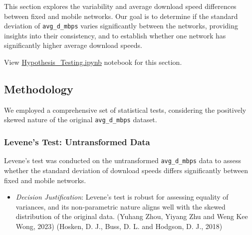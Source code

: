 \documentclass[
  letterpaper,
  DIV=11,
  numbers=noendperiod,
  oneside]{scrartcl}
\providecommand{\tightlist}{%
  \setlength{\itemsep}{0pt}\setlength{\parskip}{0pt}}\usepackage{longtable,booktabs,array}
\begin{document}
This section explores the variability and average download speed
differences between fixed and mobile networks. Our goal is to determine
if the standard deviation of \texttt{avg\_d\_mbps} varies significantly
between the networks, providing insights into their consistency, and to
establish whether one network has significantly higher average download
speeds.

\begin{tcolorbox}[enhanced jigsaw, title=\textcolor{quarto-callout-tip-color}{\faLightbulb}\hspace{0.5em}{Hypothesis Definition and Testing Section Source Code}, toptitle=1mm, bottomtitle=1mm, bottomrule=.15mm, toprule=.15mm, colback=white, leftrule=.75mm, colframe=quarto-callout-tip-color-frame, colbacktitle=quarto-callout-tip-color!10!white, titlerule=0mm, opacitybacktitle=0.6, arc=.35mm, rightrule=.15mm, left=2mm, breakable, opacityback=0, coltitle=black]

View
\href{https://github.com/brandon-toews/data-analytics-assignment/blob/main/Hypothesis_Testing.ipynb}{Hypothesis\_Testing.ipynb}
notebook for this section.

\end{tcolorbox}

\hypertarget{methodology}{%
\subsection{Methodology}\label{methodology}}

We employed a comprehensive set of statistical tests, considering the
positively skewed nature of the original \texttt{avg\_d\_mbps} dataset.

\hypertarget{levenes-test-untransformed-data}{%
\subsubsection{Levene's Test: Untransformed
Data}\label{levenes-test-untransformed-data}}

Levene's test was conducted on the untransformed \texttt{avg\_d\_mbps}
data to assess whether the standard deviation of download speeds differs
significantly between fixed and mobile networks.

\begin{itemize}
\tightlist
\item
  \emph{Decision Justification}: Levene's test is robust for assessing
  equality of variances, and its non-parametric nature aligns well with
  the skewed distribution of the original data. (Yuhang Zhou, Yiyang Zhu
  and Weng Kee Wong, 2023) (Hosken, D. J., Buss, D. L. and Hodgson, D.
  J., 2018)
\end{itemize}
\end{document}
